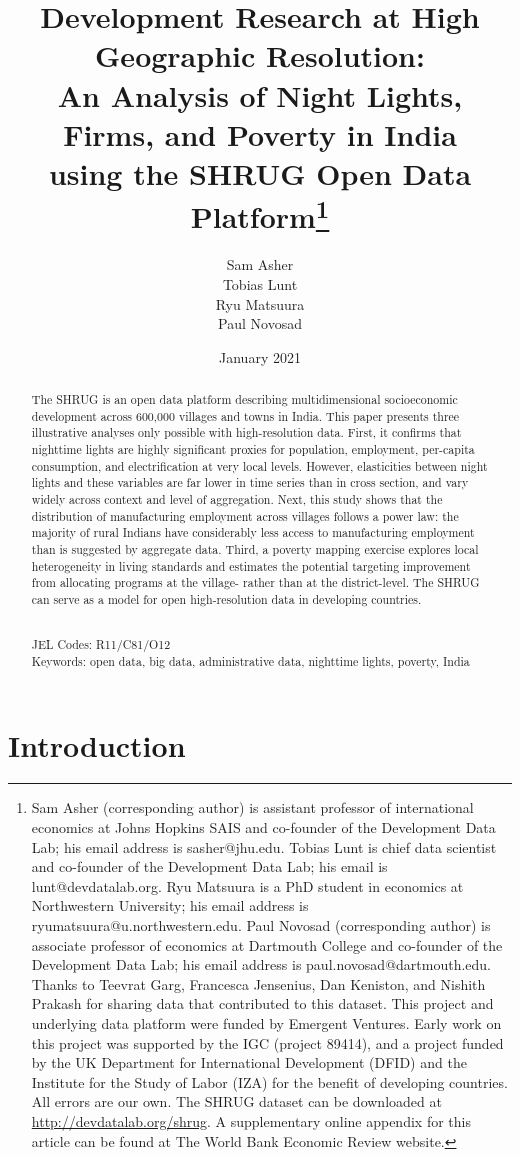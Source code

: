 \documentclass[12pt,letterpaper]{article}
\title{Development Research at High Geographic Resolution: \\ An
  Analysis of Night Lights, Firms, and Poverty in India \\ using the
  SHRUG Open Data Platform\footnote{Sam Asher (corresponding author)
    is assistant professor of international economics at Johns Hopkins
    SAIS and co-founder of the Development Data Lab; his email address
    is sasher@jhu.edu. Tobias Lunt is chief data scientist and
    co-founder of the Development Data Lab; his email is
    lunt@devdatalab.org. Ryu Matsuura is a PhD student in economics at
    Northwestern University; his email address is
    ryumatsuura@u.northwestern.edu. Paul Novosad (corresponding
    author) is associate professor of economics at Dartmouth College
    and co-founder of the Development Data Lab; his email address is
    paul.novosad@dartmouth.edu. Thanks to Teevrat Garg, Francesca
    Jensenius, Dan Keniston, and Nishith Prakash for sharing data that
    contributed to this dataset. This project and underlying data
    platform were funded by Emergent Ventures. Early work on this
    project was supported by the IGC (project 89414), and a project
    funded by the UK Department for International Development (DFID)
    and the Institute for the Study of Labor (IZA) for the benefit of
    developing countries. All errors are our own. The SHRUG dataset
    can be downloaded at
    \href{http://devdatalab.org/shrug}{http://devdatalab.org/shrug}. A
    supplementary online appendix for this article can be found at The
    World Bank Economic Review website.}}
\author{ Sam Asher \\ Tobias Lunt \\ Ryu Matsuura \\ Paul Novosad \\ }
\begin{document}
\date{January 2021}
\maketitle

\begin{abstract}

The SHRUG is an open data platform describing multidimensional
socioeconomic development across 600,000 villages and towns in
India. This paper presents three illustrative analyses only possible
with high-resolution data. First, it confirms that nighttime lights
are highly significant proxies for population, employment, per-capita
consumption, and electrification at very local levels. However,
elasticities between night lights and these variables are far lower in
time series than in cross section, and vary widely across context and
level of aggregation. Next, this study shows that the distribution of
manufacturing employment across villages follows a power law: the
majority of rural Indians have considerably less access to
manufacturing employment than is suggested by aggregate data. Third, a
poverty mapping exercise explores local heterogeneity in living
standards and estimates the potential targeting improvement from
allocating programs at the village- rather than at the
district-level. The SHRUG can serve as a model for open
high-resolution data in developing countries.
  
\\ JEL Codes: R11/C81/O12
\\ Keywords: open data, big data, administrative data, nighttime lights, poverty, India
\end{abstract}

\newpage
\clearpage
\setcounter{pag}{1} \doublespacing
\section{Introduction}
\label{sec:intro}
\end{document}
